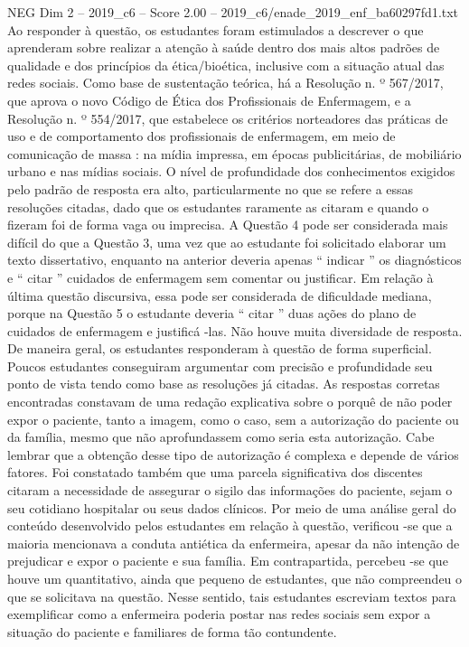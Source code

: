 \begin{textsample}{NEG Dim 2 – 2019\_c6 – Score 2.00 – 2019\_c6/enade\_2019\_enf\_ba60297fd1.txt}
Ao responder à questão, os estudantes foram estimulados a descrever o que aprenderam sobre realizar a atenção à saúde dentro dos mais altos padrões de qualidade e dos princípios da ética/bioética, inclusive com a situação atual das redes sociais.
Como base de sustentação teórica, há a Resolução n. º 567/2017, que aprova o novo Código de Ética dos Profissionais de Enfermagem, e a Resolução n. º 554/2017, que estabelece os critérios norteadores das práticas de uso e de comportamento dos profissionais de enfermagem, em meio de comunicação de massa : na mídia impressa, em épocas publicitárias, de mobiliário urbano e nas mídias sociais.
O nível de profundidade dos conhecimentos exigidos pelo padrão de resposta era alto, particularmente no que se refere a essas resoluções citadas, dado que os estudantes raramente as citaram e quando o fizeram foi de forma vaga ou imprecisa.
A Questão 4 pode ser considerada mais difícil do que a Questão 3, uma vez que ao estudante foi solicitado elaborar um texto dissertativo, enquanto na anterior deveria apenas “ indicar ” os diagnósticos e “ citar ” cuidados de enfermagem sem comentar ou justificar.
Em relação à última questão discursiva, essa pode ser considerada de dificuldade mediana, porque na Questão 5 o estudante deveria “ citar ” duas ações do plano de cuidados de enfermagem e justificá -las.
Não houve muita diversidade de resposta.
De maneira geral, os estudantes responderam à questão de forma superficial.
Poucos estudantes conseguiram argumentar com precisão e profundidade seu ponto de vista tendo como base as resoluções já citadas.
As respostas corretas encontradas constavam de uma redação explicativa sobre o porquê de não poder expor o paciente, tanto a imagem, como o caso, sem a autorização do paciente ou da família, mesmo que não aprofundassem como seria esta autorização.
Cabe lembrar que a obtenção desse tipo de autorização é complexa e depende de vários fatores.
Foi constatado também que uma parcela significativa dos discentes citaram a necessidade de assegurar o sigilo das informações do paciente, sejam o seu cotidiano hospitalar ou seus dados clínicos.
Por meio de uma análise geral do conteúdo desenvolvido pelos estudantes em relação à questão, verificou -se que a maioria mencionava a conduta antiética da enfermeira, apesar da não intenção de prejudicar e expor o paciente e sua família.
Em contrapartida, percebeu -se que houve um quantitativo, ainda que pequeno de estudantes, que não compreendeu o que se solicitava na questão.
Nesse sentido, tais estudantes escreviam textos para exemplificar como a enfermeira poderia postar nas redes sociais sem expor a situação do paciente e familiares de forma tão contundente.

\end{textsample}
